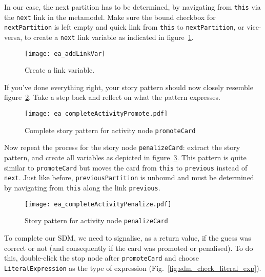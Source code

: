 In our case, the next partition has to be determined, by navigating from \texttt{this} via the \texttt{next} link in the metamodel.  Make sure the bound
checkbox for \texttt{nextPartition} is left empty and quick link from \texttt{this} to \texttt{nextPartition}, or vice-versa, to create a \texttt{next} link
variable as indicated in figure~\ref{fig:sdm_check_link_variable}.

\begin{figure}[htbp]
\begin{center}
  \texttt{[image: ea\_addLinkVar]}
  \caption{Create a link variable.}
  \label{fig:sdm_check_link_variable}
\end{center}
\end{figure}

If you've done everything right, your story pattern should now closely resemble figure~\ref{fig:sdm_check_complete_activity_node}.  Take a step back and reflect
on what the pattern expresses.

\begin{figure}[htbp]
\begin{center}
  \texttt{[image: ea\_completeActivityPromote.pdf]}
  \caption{Complete story pattern for activity node \texttt{promoteCard}}
  \label{fig:sdm_check_complete_activity_node}
\end{center}
\end{figure}

Now repeat the process for the story node \texttt{penalizeCard}: extract the story pattern, and create all variables as depicted in
figure~\ref{fig:sdm_check_complete_penalize}.  This pattern is quite similar to \texttt{promoteCard} but moves the card from \texttt{this} to \texttt{previous}
instead of \texttt{next}.  Just like before, \texttt{previousPartition} is unbound and must be determined by navigating from \texttt{this} along the link
\texttt{previous}.

\begin{figure}[htbp]
\begin{center}
  \texttt{[image: ea\_completeActivityPenalize.pdf]}
  \caption{Story pattern for activity node \texttt{penalizeCard}}
  \label{fig:sdm_check_complete_penalize}
\end{center}
\end{figure}

To complete our SDM, we need to signalise, as a return value, if the guess was correct or not (and consequently if the card was promoted or penalised).  To do
 this, double-click the stop node after \texttt{promoteCard} and choose \texttt{LiteralExpression} as the type of expression
(Fig.~\ref{fig:sdm_check_literal_exp}).


